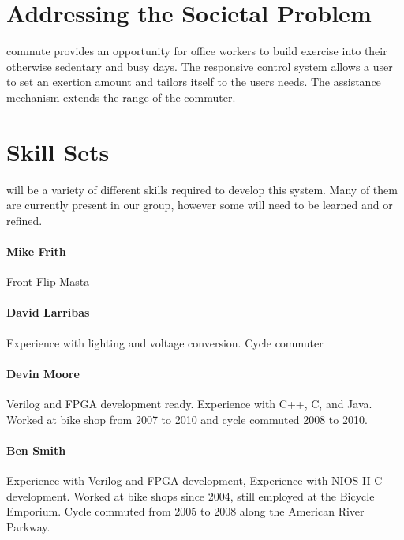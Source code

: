 \documentclass[12pt,article]{IEEEtran}
\begin{document}

	 
\section{Addressing the Societal Problem}
	
     commute provides an opportunity for office workers to build exercise into 
    their otherwise sedentary and busy days. The responsive control system allows a user to set an 
	exertion amount and tailors itself to the users needs. The assistance mechanism extends the range
	of the commuter. 

\section{Skill Sets}
	 will be a variety of different skills required to develop this system.
	 Many of them are currently present in our group, however some will need to be learned and or
	 refined. 

	\paragraph{Mike Frith}
		Front Flip Masta

	\paragraph{David Larribas}
		Experience with lighting and voltage conversion. Cycle commuter

	\paragraph{Devin Moore}
	Verilog and FPGA development ready. Experience with C++, C, and Java. Worked at bike 
	shop from 2007 to 2010 and cycle commuted 2008 to 2010.
	
	\paragraph{Ben Smith}
	Experience with Verilog and FPGA development, Experience with NIOS II C development. Worked at bike shops since 
	2004, still employed at the Bicycle Emporium. Cycle commuted from 2005 to 2008 along the
	American River Parkway.
\end{document}
